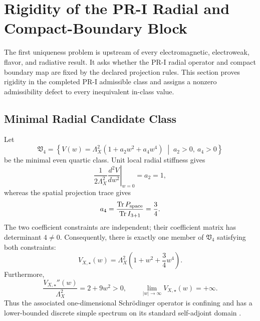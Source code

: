 \section{Rigidity of the PR-I Radial and Compact-Boundary Block}
\label{sec:pr35-pr1-radial-compact-rigidity}

The first uniqueness problem is upstream of every electromagnetic,
electroweak, flavor, and radiative result.  It asks whether the PR-I radial
operator and compact boundary map are fixed by the declared projection rules.
This section proves rigidity in the completed PR-I admissible class and assigns
a nonzero admissibility defect to every inequivalent in-class value.

\subsection{Minimal Radial Candidate Class}
\label{subsec:pr35-minimal-radial-class}

Let
\begin{equation}
\mathfrak V_4
=
\left\{
V(w)=\Lambda_X^2\left(1+a_2w^2+a_4w^4\right)
\;\middle|\;
a_2>0,\ a_4>0
\right\}
\label{eq:pr35-radial-admissible-class}
\end{equation}
be the minimal even quartic class.  Unit local radial stiffness gives
\begin{equation}
\left.
\frac{1}{2\Lambda_X^2}\frac{d^2V}{dw^2}
\right|_{w=0}
=a_2=1,
\label{eq:pr35-a2-unique}
\end{equation}
whereas the spatial projection trace gives
\begin{equation}
a_4
=
\frac{\operatorname{Tr}P_{\rm space}}
{\operatorname{Tr}I_{3+1}}
=
\frac34.
\label{eq:pr35-a4-unique}
\end{equation}
The two coefficient constraints are independent; their coefficient matrix has
determinant $4\neq0$.  Consequently, there is exactly one member of
\(\mathfrak V_4\) satisfying both constraints:
\begin{equation}
\boxed{
V_{X,\star}(w)
=
\Lambda_X^2\left(1+w^2+\frac34w^4\right).}
\label{eq:pr35-radial-unique}
\end{equation}
Furthermore,
\begin{equation}
\frac{V_{X,\star}''(w)}{\Lambda_X^2}
=2+9w^2>0,
\qquad
\lim_{|w|\to\infty}V_{X,\star}(w)=+\infty.
\end{equation}
Thus the associated one-dimensional Schr\"odinger operator is confining and
has a lower-bounded discrete simple spectrum on its standard self-adjoint
domain \cite{ReedSimon_1975}.

